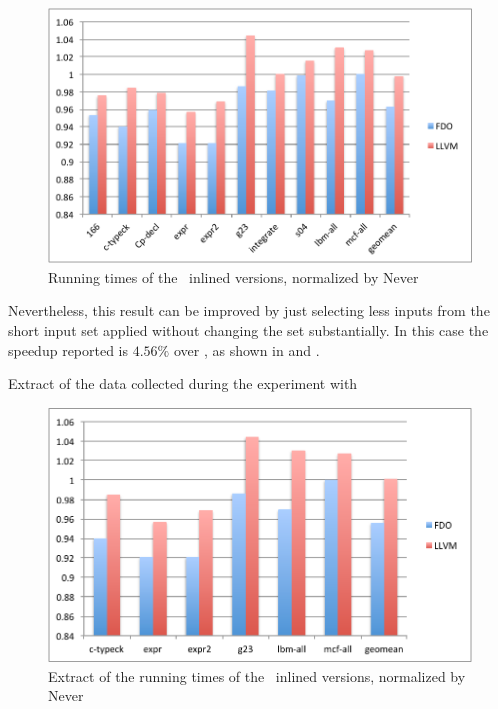 \begin{figure}
  \centering
  \includegraphics[width=1.00\linewidth]{Figures/speedupgcc}
  \caption{Running times of the \gcc\ inlined versions, normalized by Never}
  \label{fig:speedupgcc}
\end{figure}

Nevertheless, this result can be improved by just selecting less inputs from the short input set applied without changing the set substantially. In this case the speedup reported is $4.56 \%$ over \llvm, as shown in  and .

\begin{table}
  \centering
  \begin{tiny}
  
  \end{tiny}
  \caption{Extract of the data collected during the experiment with \gcc}
  \label{tab:speedupgcc1}
\end{table}

\begin{figure}
  \centering
  \includegraphics[width=1.00\linewidth]{Figures/speedupgcc1}
  \caption{Extract of the running times of the \gcc\ inlined versions, normalized by Never}
  \label{fig:speedupgcc1}
\end{figure}

